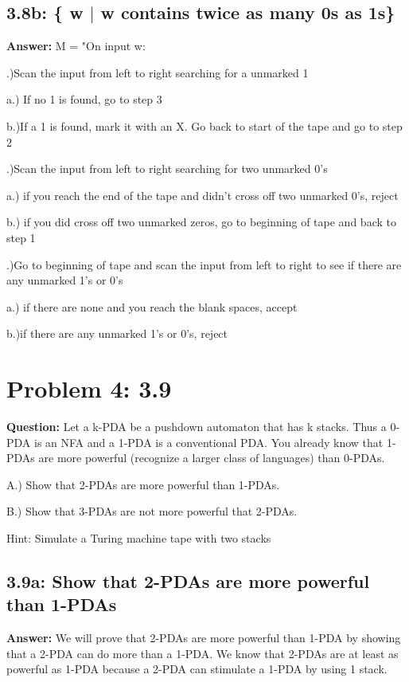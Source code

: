 \documentclass[12pt]{article}
\begin{document}
\subsection*{3.8b: \{ w $|$ w contains twice as many 0s as 1s\}}
\setlength{\parindent}{5ex}
{\bfseries Answer:} M = "On input w:

.)Scan the input from left to right searching for a unmarked 1

\indent a.) If no 1 is found, go to step 3

\indent b.)If a 1 is found, mark it with an X. Go back to start of the tape and go to step 2

.)Scan the input from left to right searching for two unmarked 0's

\indent a.) if you reach the end of the tape and didn't cross off two unmarked 0's, reject

\indent b.) if you did cross off two unmarked zeros, go to beginning of tape and back to step 1
    
.)Go to beginning of tape and scan the input from left to right to see if there are any unmarked 1's or 0's

\indent a.) if there are none and you reach the blank spaces, accept

\indent b.)if there are any unmarked 1's or 0's, reject
\setlength{\parindent}{0ex}


\section*{Problem 4: 3.9}
{\bfseries Question:} Let a k-PDA be a pushdown automaton that has k stacks. Thus a 0-PDA is an NFA and a 1-PDA is a conventional PDA. You already know that 1-PDAs are more powerful (recognize a larger class of languages) than 0-PDAs. 

A.) Show that 2-PDAs are more powerful than 1-PDAs. 

B.) Show that 3-PDAs are not more powerful that 2-PDAs.

Hint: Simulate a Turing machine tape with two stacks

\subsection*{3.9a: Show that 2-PDAs are more powerful than 1-PDAs}
{\bfseries Answer:} We will prove that 2-PDAs are more powerful than 1-PDA by showing that a 2-PDA can do more than a 1-PDA. We know that 2-PDAs are at least as powerful as 1-PDA because a 2-PDA can stimulate a 1-PDA by using 1 stack. 
\end{document}
